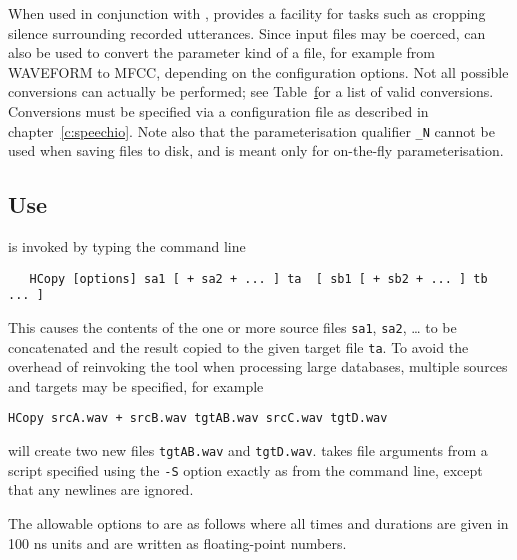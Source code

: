 When used in conjunction with ,  provides a facility for tasks
such as cropping silence surrounding recorded utterances.  Since input
files may be coerced,  can also be used to convert the parameter
kind of a file, for example from WAVEFORM to MFCC, depending on the
configuration options. 
Not all possible conversions can actually be performed; see Table~\href{t:validcons} for a list of valid conversions. Conversions must be specified via a configuration file as described in chapter~\ref{c:speechio}. Note also that the parameterisation qualifier \texttt{\_N} cannot be used when saving files to disk, and is meant only for on-the-fly parameterisation. 

\subsection{Use}

 is invoked by typing the command line
\begin{verbatim}
   HCopy [options] sa1 [ + sa2 + ... ] ta  [ sb1 [ + sb2 + ... ] tb ... ]
\end{verbatim}
This causes the contents of the one or more source files 
\texttt{sa1}, \texttt{sa2}, \ldots
 to be concatenated
and the result copied to the given target file \texttt{ta}. To avoid the overhead
of reinvoking the tool when processing large databases, multiple
sources and targets may be specified, for example
\begin{verbatim}
HCopy srcA.wav + srcB.wav tgtAB.wav srcC.wav tgtD.wav
\end{verbatim}
will create two new files \texttt{tgtAB.wav} and  \texttt{tgtD.wav}.
 takes file arguments from a script specified using the \texttt{-S} option
exactly as from the
command line, except that any newlines are ignored. 

The allowable options to  are as follows where all times
and durations are given in 100 ns units and
are written as floating-point numbers.



